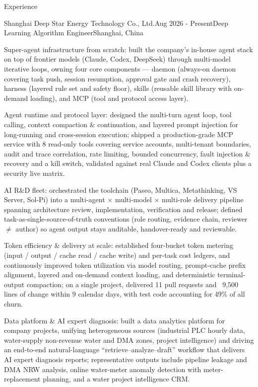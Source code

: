 \documentclass{resume} %
\begin{document}
\begin{rSection}{Experience}

    \begin{rSubsection}{Shanghai Deep Star Energy Technology Co., Ltd.}{Aug 2026 - Present}{Deep Learning Algorithm Engineer}{Shanghai, China}
        \item Super-agent infrastructure from scratch: built the company's in-house agent stack on top of frontier models (Claude, Codex, DeepSeek) through multi-model iterative loops, owning four core components --- daemon (always-on daemon covering task push, session resumption, approval gate and crash recovery), harness (layered rule set and safety floor), skills (reusable skill library with on-demand loading), and MCP (tool and protocol access layer).
        \item Agent runtime and protocol layer: designed the multi-turn agent loop, tool calling, context compaction \& continuation, and layered prompt injection for long-running and cross-session execution; shipped a production-grade MCP service with 8 read-only tools covering service accounts, multi-tenant boundaries, audit and trace correlation, rate limiting, bounded concurrency, fault injection \& recovery and a kill switch, validated against real Claude and Codex clients plus a security live matrix.
        \item AI R\&D fleet: orchestrated the toolchain (Paseo, Multica, Metathinking, VS Server, Sol-Pi) into a multi-agent $\times$ multi-model $\times$ multi-role delivery pipeline spanning architecture review, implementation, verification and release; defined task-as-single-source-of-truth conventions (role routing, evidence chain, reviewer $\neq$ author) so agent output stays auditable, handover-ready and reviewable.
        \item Token efficiency \& delivery at scale: established four-bucket token metering (input / output / cache read / cache write) and per-task cost ledgers, and continuously improved token utilization via model routing, prompt-cache prefix alignment, layered and on-demand context loading, and deterministic terminal-output compaction; on a single project, delivered 11 pull requests and ~9,500 lines of change within 9 calendar days, with test code accounting for 49\% of all churn.
        \item Data platform \& AI expert diagnosis: built a data analytics platform for company projects, unifying heterogeneous sources (industrial PLC hourly data, water-supply non-revenue water and DMA zones, project intelligence) and driving an end-to-end natural-language ``retrieve--analyze--draft'' workflow that delivers AI expert diagnosis reports; representative outputs include pipeline leakage and DMA NRW analysis, online water-meter anomaly detection with meter-replacement planning, and a water project intelligence CRM.

\end{rSubsection}
\end{rSection}
\end{document}
